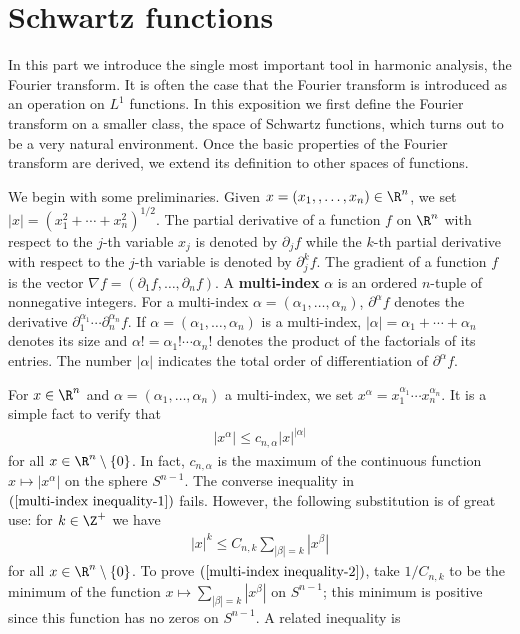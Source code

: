 \section{Schwartz functions}
In this part we introduce the single most important tool in harmonic analysis, the Fourier transform. It is often the case that the Fourier transform is introduced as an operation on $L^1$ functions. In this exposition we first define the Fourier transform on a smaller class, the space of Schwartz functions, which turns out to be a very natural environment. Once the basic properties of the Fourier transform are derived, we extend its definition to other spaces of functions.\par
We begin with some preliminaries. Given $x=(x_1,,\dots,x_n)\in\R^n$, we set $|x|=(x_1^2+\cdots+x_n^2)^{1/2}$. The partial derivative of a function $f$ on $\R^n$ with respect to the $j$-th variable $x_j$ is denoted by $\partial_jf$ while the $k$-th partial derivative with respect to the $j$-th variable is denoted by $\partial_j^kf$. The gradient of a function $f$ is the vector $\nabla f=(\partial_1f,\dots,\partial_nf)$. A \textbf{multi-index} $\alpha$ is an ordered $n$-tuple of nonnegative integers. For a multi-index $\alpha=(\alpha_1,\dots,\alpha_n)$, $\partial^\alpha f$ denotes the derivative $\partial_1^{\alpha_1}\cdots\partial_n^{\alpha_n}f$. If $\alpha=(\alpha_1,\dots,\alpha_n)$ is a multi-index, $|\alpha|=\alpha_1+\cdots+\alpha_n$ denotes its size and $\alpha!=\alpha_1!\cdots\alpha_n!$ denotes the product of the factorials of its entries. The number $|\alpha|$ indicates the total order of differentiation of $\partial^\alpha f$.\par
For $x\in\R^n$ and $\alpha=(\alpha_1,\dots,\alpha_n)$ a multi-index, we set $x^\alpha=x_1^{\alpha_1}\cdots x_n^{\alpha_n}$. It is a simple fact to verify that
\begin{align}\label{multi-index inequality-1}
|x^\alpha|\leq c_{n,\alpha}|x|^{|\alpha|}
\end{align}
for all $x\in\R^n\setminus\{0\}$. In fact, $c_{n,\alpha}$ is the maximum of the continuous function $x\mapsto|x^\alpha|$ on the sphere $S^{n-1}$. The converse inequality in $(\ref{multi-index inequality-1})$ fails. However, the following substitution is of great use: for $k\in\Z^+$ we have
\begin{align}\label{multi-index inequality-2}
|x|^k\leq C_{n,k}\sum_{|\beta|=k}|x^\beta|
\end{align}
for all $x\in\R^n\setminus\{0\}$. To prove $(\ref{multi-index inequality-2})$, take $1/C_{n,k}$ to be the minimum of the function $x\mapsto\sum_{|\beta|=k}|x^\beta|$ on $S^{n-1}$; this minimum is positive since this function has no zeros on $S^{n-1}$. A related inequality is
